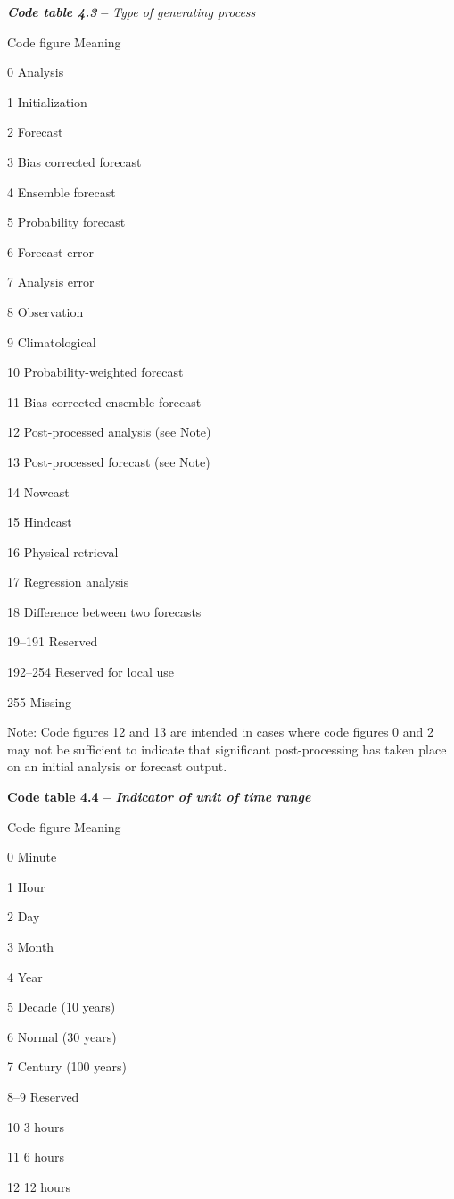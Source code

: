 \emph{\textbf{Code table 4.3}} \textbf{--} \emph{Type of generating process}

Code figure Meaning

0 Analysis

1 Initialization

2 Forecast

3 Bias corrected forecast

4 Ensemble forecast

5 Probability forecast

6 Forecast error

7 Analysis error

8 Observation

9 Climatological

10 Probability-weighted forecast

11 Bias-corrected ensemble forecast

12 Post-processed analysis (see Note)

13 Post-processed forecast (see Note)

14 Nowcast

15 Hindcast

16 Physical retrieval

17 Regression analysis

18 Difference between two forecasts

19--191 Reserved

192--254 Reserved for local use

255 Missing

Note: Code figures 12 and 13 are intended in cases where code figures 0 and 2 may not be sufficient to indicate that significant post-processing has taken place on an initial analysis or forecast output.

\textbf{Code table 4.4 -- \emph{Indicator of unit of time range}}

Code figure Meaning

0 Minute

1 Hour

2 Day

3 Month

4 Year

5 Decade (10 years)

6 Normal (30 years)

7 Century (100 years)

8--9 Reserved

10 3 hours

11 6 hours

12 12 hours

